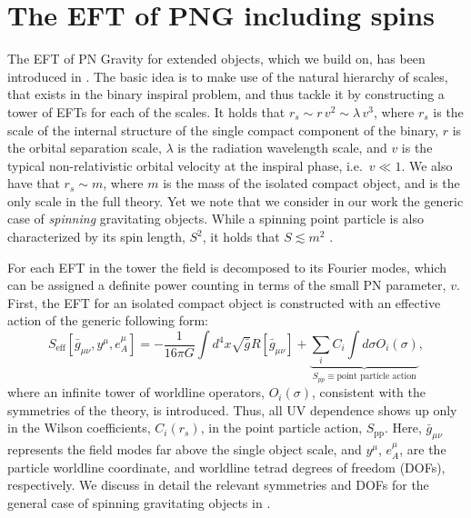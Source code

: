 \documentclass[a4paper,11pt]{article}
\newcommand{\be}{\begin{equation}}
\newcommand{\ee}{\end{equation}}
\begin{document}
\section{The EFT of PNG including spins}
\label{theory}

The EFT of PN Gravity for extended objects, which we build on, has been introduced in 
\cite{Goldberger:2004jt,Goldberger:2007hy}. The basic idea is to make use of the natural 
hierarchy of scales, that exists in the binary inspiral problem, and thus tackle it by 
constructing a tower of EFTs for each of the scales. It holds that $r_s\sim r\,v^2 \sim 
\lambda \, v^3$, where $r_s$ is the scale of the internal structure of the single compact 
component of the binary, $r$ is the orbital separation scale, $\lambda$ is the radiation 
wavelength scale, and $v$ is the typical non-relativistic orbital velocity at the inspiral 
phase, i.e.~$v\ll 1$. We also have that $r_s\sim m$, where $m$ is the mass of the isolated 
compact object, and is the only scale in the full theory. Yet we note that we consider in 
our work the generic case of \textit{spinning} gravitating objects. While a spinning point 
particle is also characterized by its spin length, $S^2$,  it holds that $S\lesssim m^2$ 
\cite{Levi:2015msa}.

For each EFT in the tower the field is decomposed to its Fourier modes, which can be 
assigned a definite power counting in terms of the small PN parameter, $v$. First, the EFT 
for an isolated compact object is constructed with an effective action of the generic 
following form:
\be\label{seffsingobj}
S_{\text{eff}}\left[\bar{g}_{\mu\nu},y^\mu,e^{\mu}_{A}\right]=
-\frac{1}{16\pi G} \int d^4x \sqrt{\bar{g}} R\left[\bar{g}_{\mu\nu}\right] + 
\underbrace{\sum_{i}C_i\int d\sigma O_i(\sigma)}_{S_{pp}\equiv
\text{point particle action}},
\ee 
where an infinite tower of worldline operators, $O_i(\sigma)$, consistent with the 
symmetries of the theory, is introduced. Thus, all UV dependence shows up only in the Wilson 
coefficients, $C_i(r_s)$, in the point particle action, $S_{\text{pp}}$. Here, 
$\bar{g}_{\mu\nu}$ represents the field modes far above the single object scale, and 
$y^\mu$, $e^{\mu}_{A}$, are the particle worldline coordinate, and worldline tetrad degrees 
of freedom (DOFs), respectively. We discuss in detail the relevant symmetries and DOFs for 
the general case of spinning gravitating objects in \cite{Levi:2015msa}.
\end{document}
